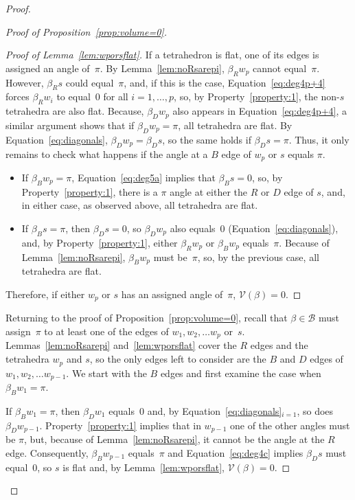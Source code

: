 \documentclass[reqno]{amsart}
\theoremstyle{plain}
\theoremstyle{definition}
\begin{document}
\begin{proof}
\begin{proof}[Proof of Proposition~\ref{prop:volume=0}]
\begin{proof}[Proof of Lemma~\ref{lem:wporsflat}]
If a tetrahedron is flat, one of its edges is assigned an angle of~$\pi$.  By Lemma~\ref{lem:noRsarepi}, $\beta_R w_p$ cannot equal~$\pi$.  However, $\beta_R s$ could equal~$\pi$, and, if this is the case, Equation~\eqref{eq:deg4p+4} forces $\beta_R w_i$ to equal~$0$ for all $i=1,\dots,p$, so, by Property~\ref{property:1}, the non-$s$ tetrahedra are also flat.  Because, $\beta_D w_p$ also appears in Equation~\eqref{eq:deg4p+4}, a similar argument shows that if $\beta_D w_p=\pi$, all tetrahedra are flat.  By Equation~\eqref{eq:diagonals}, $\beta_D w_p=\beta_D s$, so the same holds if $\beta_D s=\pi$.  Thus, it only remains to check what happens if the angle at a $B$ edge of $w_p$ or $s$ equals $\pi$.
\begin{itemize}
    \item If $\beta_B w_p=\pi$, Equation~\eqref{eq:deg5a} implies that $\beta_B s=0$, so, by Property~\ref{property:1}, there is a $\pi$ angle at either the $R$ or $D$ edge of $s$, and, in either case, as observed above, all tetrahedra are flat.  
    \item If $\beta_B s=\pi$, then $\beta_D s=0$, so $\beta_D w_p$ also equals~$0$ (Equation~\eqref{eq:diagonals}), and, by Property~\ref{property:1}, either $\beta_R w_p$ or $\beta_B w_p$ equals~$\pi$.  Because of Lemma~\ref{lem:noRsarepi}, $\beta_B w_p$  must be~$\pi$, so, by the previous case, all tetrahedra are flat.
\end{itemize}
Therefore, if either $w_p$ or $s$  has an  assigned angle of~$\pi$, $\mathcal{V}(\beta)=0$.
\end{proof}

Returning to the proof of Proposition~\ref{prop:volume=0}, recall that $\beta\in\mathcal{B}$ must assign~$\pi$ to at least one of the edges of $w_1, w_2, \dots w_p$ or~$s$.  Lemmas~\ref{lem:noRsarepi} and~\ref{lem:wporsflat} cover the $R$ edges and the tetrahedra $w_p$ and $s$, so the only edges left to consider are the $B$ and $D$ edges of $w_1, w_2, \dots w_{p-1}$.  We start with the $B$ edges and first examine the case when $\beta_B w_1=\pi$.

If $\beta_B w_1=\pi$, then $\beta_D w_1$ equals~$0$ and, by Equation~\eqref{eq:diagonals}$_{i=1}$, so does $\beta_D w_{p-1}$.  Property~\ref{property:1} implies that in $w_{p-1}$ one of the other angles must be $\pi$, but, because of  Lemma~\ref{lem:noRsarepi}, it cannot be the angle at the $R$ edge. Consequently, $\beta_B w_{p-1}$ equals~$\pi$ and Equation~\eqref{eq:deg4c} implies
$\beta_D s$ must equal~$0$, so $s$ is flat and, by Lemma~\ref{lem:wporsflat}, $\mathcal{V}(\beta)=0$.  


\end{proof}
\end{proof}
\end{document}
